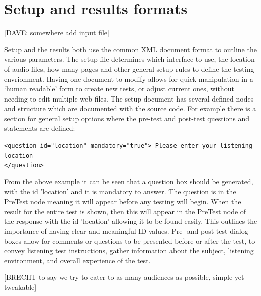 \documentclass{article}
\begin{document}

\section{Setup and results formats}\label{sec:setupresultsformats}

[DAVE: somewhere add input file]

Setup and the results both use the common XML document format to outline the various parameters. The setup file determines which interface to use, the location of audio files, how many pages and other general setup rules to define the testing envrionment. Having one document to modify allows for quick manipulation in a `human readable' form to create new tests, or adjust current ones, without needing to edit multiple web files. %
The setup document has several defined nodes and structure which are documented with the source code. For example there is a section for general setup options where the pre-test and post-test questions and statements are defined:

\texttt{<question id="location" mandatory="true"> Please enter your listening location \\ </question>}

From the above example it can be seen that a question box should be generated, with the id 'location' and it is mandatory to answer. The question is in the PreTest node meaning it will appear before any testing will begin. When the result for the  entire test is shown, then this will appear in the PreTest node of the response with the id 'location' allowing it to be found easily. This outlines the importance of having clear and meaningful ID values. Pre- and post-test dialog boxes allow for comments or questions to be presented before or after the test, to convey listening test instructions, gather information about the subject, listening environment, and overall experience of the test.
 
[BRECHT to say we try to cater to as many audiences as possible, simple yet tweakable]
\end{document}
